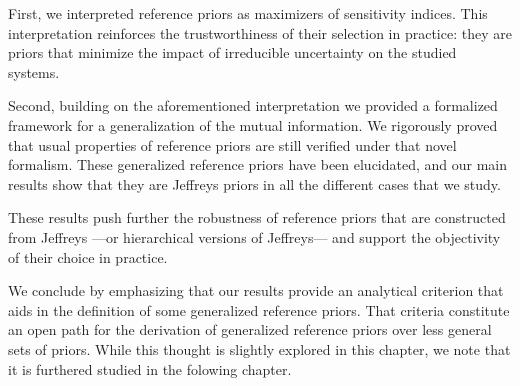 First, we interpreted reference priors as maximizers of sensitivity indices. This interpretation reinforces the trustworthiness of their selection in practice: they are  priors that minimize the impact of irreducible uncertainty on the studied systems. %

Second, building on the aforementioned interpretation 
we provided a formalized framework for a generalization of the mutual information. We rigorously proved that usual properties of reference priors are still verified under that novel formalism. These generalized reference priors have been elucidated, and our main results show that they are Jeffreys priors in all the different cases that we study.

These results
push further the robustness of reference priors that are constructed from Jeffreys ---or hierarchical versions of Jeffreys--- and support the objectivity of their choice in practice.


We conclude by emphasizing that our results provide  an analytical criterion that aids in the definition of some generalized reference priors.
That criteria constitute an open path for the derivation of generalized reference priors over less general sets of priors.
While this thought is slightly explored in this chapter, we note that it is furthered studied in the folowing chapter.












